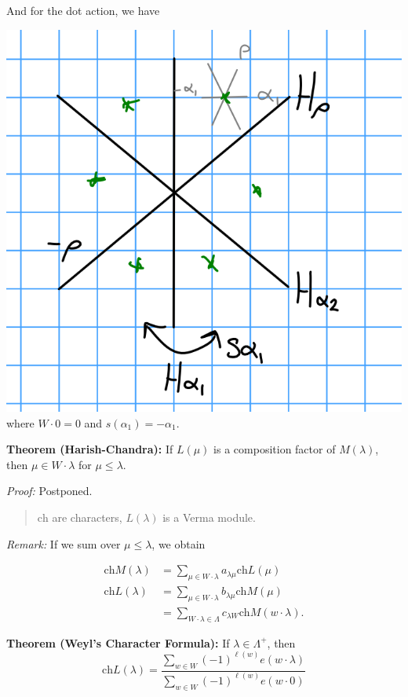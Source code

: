 And for the dot action, we have

\includegraphics{figures/2019-11-20-09:22.png}\\

where \(W \cdot 0 = 0\) and \(s(\alpha_1) = -\alpha_1\).

\textbf{Theorem (Harish-Chandra):} If \(L(\mu)\) is a composition factor
of \(M(\lambda)\), then \(\mu \in W\cdot \lambda\) for
\(\mu \leq \lambda\).

\emph{Proof:} Postponed.

\begin{quote}
\(\mathrm{ch}\) are characters, \(L(\lambda)\) is a Verma module.
\end{quote}

\emph{Remark:} If we sum over \(\mu \leq \lambda\), we obtain

\begin{align*}
\mathrm{ch} M(\lambda) &= \sum_{\mu \in W \cdot \lambda} a_{\lambda \mu} \mathrm{ch} L(\mu) \\
\mathrm{ch} L(\lambda) &= \sum_{\mu \in W \cdot \lambda} b_{\lambda \mu} \mathrm{ch} M(\mu) \\
&= \sum_{W\cdot \lambda \in \Lambda} c_{\lambda W} \mathrm{ch} M(w\cdot \lambda)
.\end{align*}

\textbf{Theorem (Weyl's Character Formula):} If
\(\lambda \in \Lambda^+\), then \[
\mathrm{ch} L(\lambda) = \frac{ \sum_{w\in W} (-1)^{\ell(w)} e(w \cdot \lambda) }{ \sum_{w\in W} (-1)^{\ell(w)} e(w\cdot 0) }
\]

